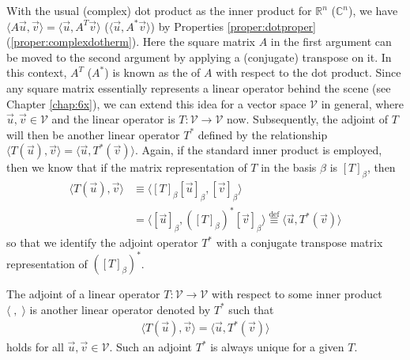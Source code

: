 With the usual (complex) dot product as the inner product for $\mathbb{R}^n$ ($\mathbb{C}^n$), we have $\langle A\vec{u}, \vec{v} \rangle = \langle \vec{u}, A^T\vec{v} \rangle$ ($\langle \vec{u}, A^*\vec{v} \rangle$) by Properties \ref{proper:dotproper} (\ref{proper:complexdotherm}). Here the square matrix $A$ in the first argument can be moved to the second argument by applying a (conjugate) transpose on it. In this context, $A^T$ ($A^*$) is known as the  of $A$ with respect to the dot product. Since any square matrix essentially represents a linear operator behind the scene (see Chapter \ref{chap:6x}), we can extend this idea for a vector space $\mathcal{V}$ in general, where $\vec{u}, \vec{v} \in \mathcal{V}$ and the linear operator is $T: \mathcal{V} \to \mathcal{V}$ now. Subsequently, the adjoint of $T$ will then be another linear operator $T^*$ defined by the relationship $\langle T(\vec{u}), \vec{v} \rangle = \langle \vec{u}, T^*(\vec{v}) \rangle$. Again, if the standard inner product is employed, then we know that if the matrix representation of $T$ in the basis $\beta$ is $[T]_\beta$, then
\begin{align*}
\langle T(\vec{u}), \vec{v} \rangle &\equiv \langle [T]_\beta[\vec{u}]_\beta, [\vec{v}]_\beta \rangle \\ 
&= \langle [\vec{u}]_\beta, ([T]_\beta)^*[\vec{v}]_\beta \rangle \stackrel{\text{def}}{\equiv} \langle \vec{u}, T^*(\vec{v}) \rangle
\end{align*}
so that we identify the adjoint operator $T^*$ with a conjugate transpose matrix representation of $([T]_\beta)^*$. 
\begin{defn}[Adjoint]
\label{defn:adjoint}
The adjoint of a linear operator $T: \mathcal{V} \to \mathcal{V}$ with respect to some inner product $\langle \;, \;\rangle$ is another linear operator denoted by $T^*$ such that
\begin{align*}
\langle T(\vec{u}), \vec{v} \rangle = \langle \vec{u}, T^*(\vec{v}) \rangle    
\end{align*}
holds for all $\vec{u}, \vec{v} \in \mathcal{V}$. Such an adjoint $T^*$ is always unique for a given $T$. 
\end{defn}
